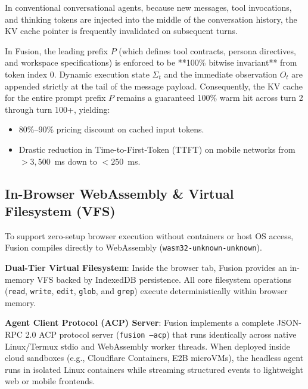In conventional conversational agents, because new messages, tool invocations, and thinking tokens are injected into the middle of the conversation history, the KV cache pointer is frequently invalidated on subsequent turns.

In Fusion, the leading prefix $P$ (which defines tool contracts, persona directives, and workspace specifications) is enforced to be **100\% bitwise invariant** from token index 0. Dynamic execution state $\Sigma_t$ and the immediate observation $O_t$ are appended strictly at the tail of the message payload. Consequently, the KV cache for the entire prompt prefix $P$ remains a guaranteed 100\% warm hit across turn 2 through turn 100+, yielding:
\begin{itemize}
    \item 80\%--90\% pricing discount on cached input tokens.
    \item Drastic reduction in Time-to-First-Token (TTFT) on mobile networks from $>3,500$~ms down to $<250$~ms.
\end{itemize}

\subsection{In-Browser WebAssembly \& Virtual Filesystem (VFS)}
To support zero-setup browser execution without containers or host OS access, Fusion compiles directly to WebAssembly (\texttt{wasm32-unknown-unknown}). 

\noindent\textbf{Dual-Tier Virtual Filesystem}:
Inside the browser tab, Fusion provides an in-memory VFS backed by IndexedDB persistence. All core filesystem operations (\texttt{read}, \texttt{write}, \texttt{edit}, \texttt{glob}, and \texttt{grep}) execute deterministically within browser memory. 

\noindent\textbf{Agent Client Protocol (ACP) Server}:
Fusion implements a complete JSON-RPC 2.0 ACP protocol server (\texttt{fusion --acp}) that runs identically across native Linux/Termux stdio and WebAssembly worker threads. When deployed inside cloud sandboxes (e.g., Cloudflare Containers, E2B microVMs), the headless agent runs in isolated Linux containers while streaming structured events to lightweight web or mobile frontends.
